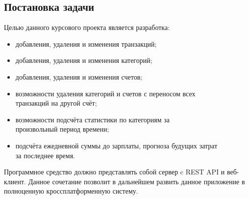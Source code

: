 \subsection{Постановка задачи}

Целью данного курсового проекта является разработка:
\begin{itemize}
\item добавления, удаления и изменения транзакций;
\item добавления, удаления и изменения категорий;
\item добавления, удаления и изменения счетов;
\item возможности удаления категорий и счетов с переносом всех \\ транзакций на другой счёт;
\item возможности подсчёта статистики по категориям за \\ произвольный период времени;
\item подсчёта ежедневной суммы до зарплаты, прогноза будущих затрат \\ за последнее время.
\end{itemize}

Программное средство должно представлять собой сервер c REST API и веб-клиент.
Данное сочетание позволит в дальнейшем развить данное приложение в полноценную
кроссплатформенную систему.